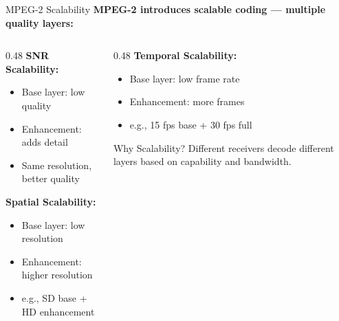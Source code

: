 \documentclass[aspectratio=169,12pt]{beamer}
\begin{document}
\begin{frame}{MPEG-2 Scalability}
    \textbf{MPEG-2 introduces scalable coding --- multiple quality layers:}
    
    \vspace{0.3cm}
    \begin{columns}
        \begin{column}{0.48\textwidth}
            \textbf{SNR Scalability:}
            \begin{itemize}
                \item Base layer: low quality
                \item Enhancement: adds detail
                \item Same resolution, better quality
            \end{itemize}
            
            \vspace{0.2cm}
            \textbf{Spatial Scalability:}
            \begin{itemize}
                \item Base layer: low resolution
                \item Enhancement: higher resolution
                \item e.g., SD base + HD enhancement
            \end{itemize}
        \end{column}
        \begin{column}{0.48\textwidth}
            \textbf{Temporal Scalability:}
            \begin{itemize}
                \item Base layer: low frame rate
                \item Enhancement: more frames
                \item e.g., 15 fps base + 30 fps full
            \end{itemize}
            
            \vspace{0.3cm}
            \begin{block}{Why Scalability?}
                Different receivers decode different layers based on capability and bandwidth.
            \end{block}
        \end{column}
    \end{columns}
\end{frame}
\end{document}
